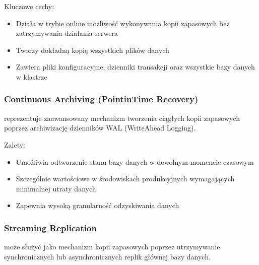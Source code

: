 \documentclass[letterpaper,10pt,polish]{sphinxmanual}
\begin{document}
\sphinxAtStartPar
Kluczowe cechy:
\begin{itemize}
\item {} 
\sphinxAtStartPar
Działa w trybie online \sphinxhyphen{} możliwość wykonywania kopii zapasowych bez zatrzymywania działania serwera

\item {} 
\sphinxAtStartPar
Tworzy dokładną kopię wszystkich plików danych

\item {} 
\sphinxAtStartPar
Zawiera pliki konfiguracyjne, dzienniki transakcji oraz wszystkie bazy danych w klastrze

\end{itemize}


\subsubsection{Continuous Archiving (Point\sphinxhyphen{}in\sphinxhyphen{}Time Recovery)}
\label{\detokenize{rozdzial2/Kopie_zapasowe_i_odzyskiwanie_danych/kopie_zapasowe_i_odzyskiwanie_danych:continuous-archiving-point-in-time-recovery}}
\sphinxAtStartPar
{} reprezentuje zaawansowany mechanizm tworzenia ciągłych kopii zapasowych poprzez archiwizację dzienników WAL (Write\sphinxhyphen{}Ahead Logging).

\sphinxAtStartPar
Zalety:
\begin{itemize}
\item {} 
\sphinxAtStartPar
Umożliwia odtworzenie stanu bazy danych w dowolnym momencie czasowym

\item {} 
\sphinxAtStartPar
Szczególnie wartościowe w środowiskach produkcyjnych wymagających minimalnej utraty danych

\item {} 
\sphinxAtStartPar
Zapewnia wysoką granularność odzyskiwania danych

\end{itemize}


\subsubsection{Streaming Replication}
\label{\detokenize{rozdzial2/Kopie_zapasowe_i_odzyskiwanie_danych/kopie_zapasowe_i_odzyskiwanie_danych:streaming-replication}}
\sphinxAtStartPar
{} może służyć jako mechanizm kopii zapasowych poprzez utrzymywanie synchronicznych lub asynchronicznych replik głównej bazy danych.
\end{document}
